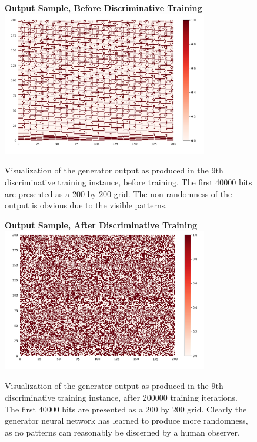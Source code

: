 \documentclass[12pt, titlepage]{report}
\theoremstyle{definition}
\begin{document}
\begin{figure}[H]
    \centering
    \textbf{Output Sample, Before Discriminative Training}
    \includegraphics[width=0.8\textwidth]{img/discriminative_before}\\
    \caption[Visualization of output randomness before training, D9]{Visualization of the generator output as produced in the 9th discriminative training instance, before training. The first 40000 bits are presented as a 200 by 200 grid. The non-randomness of the output is obvious due to the visible patterns.}
    \label{figure:visualize_discriminative_before}
    \end{figure}
    
    \begin{figure}[H]
    \centering
    \textbf{Output Sample, After Discriminative Training}
    \includegraphics[width=0.8\textwidth]{img/discriminative_after}\\
    \caption[Visualization of output randomness after training, D9]{Visualization of the generator output as produced in the 9th discriminative training instance, after 200000 training iterations. The first 40000 bits are presented as a 200 by 200 grid. Clearly the generator neural network has learned to produce more randomness, as no patterns can reasonably be discerned by a human observer.}
    \label{figure:visualize_discriminative_after}
    \end{figure}
    
\end{document}
